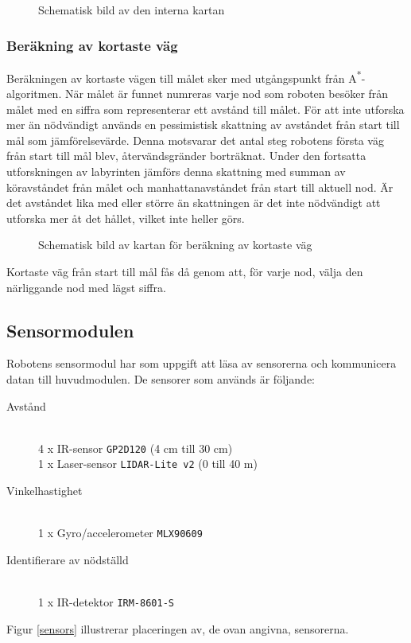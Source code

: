 \documentclass[11pt]{article}
\begin{document}
\begin{flushleft}
\begin{figure}[htbp]
\centering
\noindent\resizebox{0.7\linewidth}{!}{
	}
	\caption{Schematisk bild av den interna kartan}	\label{map}
\end{figure}

\subsubsection{Beräkning av kortaste väg} \label{shortestPath}
Beräkningen av kortaste vägen till målet sker med utgångspunkt från A\textsuperscript{*}-algoritmen. När målet är funnet numreras varje nod som roboten besöker från målet med en siffra som representerar ett avstånd till målet. För att inte utforska mer än nödvändigt används en pessimistisk skattning av avståndet från start till mål som jämförelsevärde. Denna motsvarar det antal steg robotens första väg från start till mål blev, återvändsgränder borträknat. Under den fortsatta utforskningen av labyrinten jämförs denna skattning med summan av köravståndet från målet  och manhattanavståndet från start till aktuell nod. Är det avståndet lika med eller större än skattningen är det inte nödvändigt att utforska mer åt det hållet, vilket inte heller görs.


\begin{figure}[htbp]
\centering
\noindent\resizebox{0.7\linewidth}{!}{
	}
	\caption{Schematisk bild av kartan för beräkning av kortaste väg}	\label{path}
\end{figure}


Kortaste väg från start till mål fås då genom att, för varje nod, välja den närliggande nod med lägst siffra.

\pagebreak

\subsection{Sensormodulen}
Robotens sensormodul har som uppgift att läsa av sensorerna och kommunicera datan till huvudmodulen. De sensorer som används är följande:
\begin{description}
	\item[Avstånd] \hfill \\
	4 x IR-sensor \verb+GP2D120+ (4 cm till 30 cm) \\
	1 x Laser-sensor \verb+LIDAR-Lite v2+ (0 till 40 m) \\
	\item[Vinkelhastighet] \hfill \\
	1 x Gyro/accelerometer \verb+MLX90609+ 
	\item[Identifierare av nödställd] \hfill \\
	1 x IR-detektor \verb+IRM-8601-S+
\end{description}
Figur \ref{sensors} illustrerar placeringen av, de ovan angivna, sensorerna. 


\end{flushleft}
\end{document}
